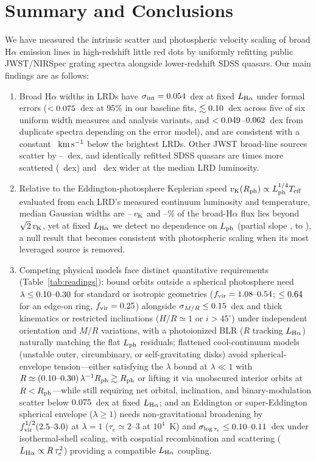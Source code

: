 \documentclass[twocolumn,linenumbers]{aastex701}
\newcommand{\Ha}{H$\alpha$}
\newcommand{\kms}{\ensuremath{{\rm km\,s^{-1}}}}
\newcommand{\sigint}{\sigma_{\rm int}}
\newcommand{\LHa}{L_{\rm H\alpha}}
\newcommand{\Lph}{L_{\rm ph}}
\newcommand{\Rph}{R_{\rm ph}}
\newcommand{\Teff}{T_{\rm eff}}
\newcommand{\vK}{v_{\rm K}}
\begin{document}
\section{Summary and Conclusions} \label{sec:summary}

We have measured the intrinsic scatter and photospheric velocity scaling of broad \Ha{} emission lines in high-redshift little red dots by uniformly refitting public JWST/NIRSpec grating spectra alongside lower-redshift SDSS quasars. Our main findings are as follows:

\begin{enumerate}
\item Broad \Ha{} widths in \NLRD{} LRDs have $\sigint=\Fsig{}$~dex at fixed $\LHa$ under formal errors ($<0.075{}$~dex at 95\% in our baseline fits, $\lesssim0.10{}$~dex across five of six uniform width measures and analysis variants, and $<0.049{}$--$0.062{}$~dex from duplicate spectra depending on the error model), and are consistent with a constant \WConstMed{}~\kms{} below the \NBright{} brightest LRDs. Other JWST broad-line sources scatter by \sigTwoLo{}--\sigTwoHi{}~dex, and identically refitted SDSS quasars are \sdssRatSame{} times more scattered (\Ssg{}~dex) and \sdssWoff{}~dex wider at the median LRD luminosity.
\item Relative to the Eddington-photosphere Keplerian speed $\vK(\Rph)\propto\Lph^{1/4}\Teff$ evaluated from each LRD's measured continuum luminosity and temperature, median Gaussian widths are \ratLo{}--\ratHi{}\,$\vK$ and \fEscNpLo{}--\fEscNpHi{}\% of the broad-\Ha{} flux lies beyond $\sqrt{2}\,\vK$, yet at fixed $\LHa$ we detect no dependence on $\Lph$ (partial slope \bpJA{}, \bpJAlo{} to \bpJAhi{}), a null result that becomes consistent with photospheric scaling when its most leveraged source is removed.
\item Competing physical models face distinct quantitative requirements (Table~\ref{tab:readings}): bound orbits outside a spherical photosphere need $\lambda\leq0.10{}\text{--}0.30{}$ for standard or isotropic geometries ($f_{\rm vir}=1.08\text{--}0.54$; $\leq0.64{}$ for an edge-on ring, $f_{\rm vir}=0.25$) alongside $\sigma_{M/R}\leq0.15{}$~dex and thick kinematics or restricted inclinations ($H/R\simeq1$ or $i>45^\circ$) under independent orientation and $M/R$ variations, with a photoionized BLR ($R$ tracking $\LHa$) naturally matching the flat $\Lph$ residuals; flattened cool-continuum models (unstable outer, circumbinary, or self-gravitating disks) avoid spherical-envelope tension---either satisfying the $\lambda$ bound at $\lambda\ll1$ with $R\simeq(\lamVirLo{}\text{--}\lamIsoHi{})\,\lambda^{-1}\Rph\gtrsim\Rph$ or lifting it via unobscured interior orbits at $R<\Rph$---while still requiring net orbital, inclination, and binary-modulation scatter below $0.075{}$~dex at fixed $\LHa$; and an Eddington or super-Eddington spherical envelope ($\lambda\geq1$) needs non-gravitational broadening by $f_{\rm vir}^{1/2}(2.5{}\text{--}3.0{})$ at $\lambda=1$ ($\tau_e\simeq2$--3 at $10^{4}$~K) and $\sigma_{\log\tau_e}\leq0.10{}\text{--}0.11{}$~dex under isothermal-shell scaling, with cospatial recombination and scattering ($\LHa\propto R\,\tau_e^{2}$) providing a compatible $\LHa$ coupling.

\end{enumerate}
\end{document}
